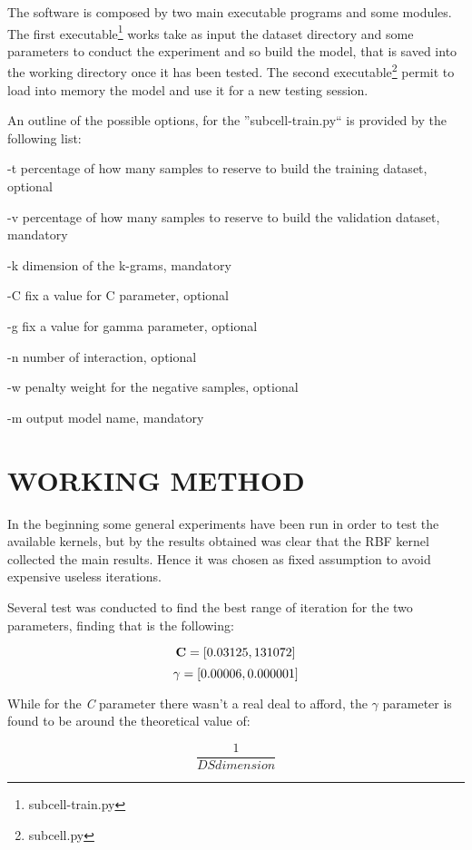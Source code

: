 \documentclass{acm_proc_article-sp-sigmod07}
\begin{document}
The software is composed by two main executable programs and some modules.
The first executable\footnote{subcell-train.py}
works take as input the dataset directory and some parameters 
to conduct the experiment and so build the model, that is saved into the working 
directory once it has been tested. The second executable\footnote{subcell.py}
permit to load into memory the model and use it for a new testing session.

An outline of the possible options, for the ''subcell-train.py`` 
is provided by the following list:
\begin{description}
\item{-t} percentage of how many samples to reserve to build the training dataset, 
optional 
\item{-v} percentage of how many samples to reserve to build the validation dataset, 
mandatory
\item{-k} dimension of the k-grams, mandatory
\item{-C} fix a value for C parameter, optional
\item{-g} fix a value for gamma parameter, optional
\item{-n} number of interaction, optional
\item{-w} penalty weight for the negative samples, optional
\item{-m} output model name, mandatory
\end{description}


\section{WORKING METHOD}
In the beginning some general experiments have been run in order to test the
available kernels, but by the results obtained was clear that the RBF kernel
collected the main results. Hence it was chosen as fixed assumption to avoid
expensive useless iterations.

Several test was conducted to find the best range of iteration for the two
parameters, finding that is the following:

$$
	\bold{C} = [0.03125, 131072]
$$
$$
 	\bold{\gamma} = [0.00006, 0.000001]
$$

While for the \emph{C} parameter there wasn't a real deal to afford, the 
$ \gamma $ parameter is found to be around the theoretical value of:

\begin{equation}
\frac{1}{DSdimension}
\label{gamma}
\end{equation}
\end{document}
